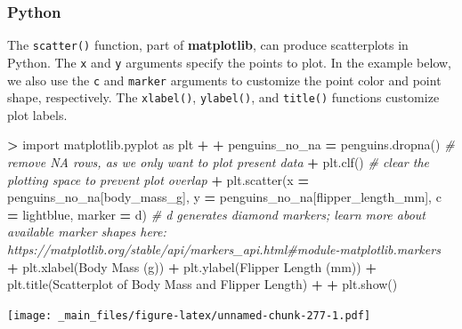 \documentclass[
]{book}
\newenvironment{Shaded}{\begin{snugshade}}{\end{snugshade}}
\newcommand{\CommentTok}[1]{\textcolor[rgb]{0.56,0.35,0.01}{\textit{#1}}}
\newcommand{\ImportTok}[1]{#1}
\newcommand{\NormalTok}[1]{#1}
\newcommand{\OperatorTok}[1]{\textcolor[rgb]{0.81,0.36,0.00}{\textbf{#1}}}
\newcommand{\StringTok}[1]{\textcolor[rgb]{0.31,0.60,0.02}{#1}}
\begin{document}
\hypertarget{python-43}{%
\subsubsection*{Python}\label{python-43}}

The \texttt{scatter()} function, part of \textbf{matplotlib}, can produce scatterplots in Python. The \texttt{x} and \texttt{y} arguments specify the points to plot. In the example below, we also use the \texttt{c} and \texttt{marker} arguments to customize the point color and point shape, respectively. The \texttt{xlabel()}, \texttt{ylabel()}, and \texttt{title()} functions customize plot labels.

\begin{Shaded}
\begin{Highlighting}[]
\OperatorTok{\textgreater{}} \ImportTok{import}\NormalTok{ matplotlib.pyplot }\ImportTok{as}\NormalTok{ plt}
\OperatorTok{+} 
\OperatorTok{+}\NormalTok{ penguins\_no\_na }\OperatorTok{=}\NormalTok{ penguins.dropna() }\CommentTok{\# remove NA rows, as we only want to plot present data}
\OperatorTok{+}\NormalTok{ plt.clf() }\CommentTok{\# clear the plotting space to prevent plot overlap}
\OperatorTok{+}\NormalTok{ plt.scatter(x }\OperatorTok{=}\NormalTok{ penguins\_no\_na[}\StringTok{\textquotesingle{}body\_mass\_g\textquotesingle{}}\NormalTok{], y }\OperatorTok{=}\NormalTok{ penguins\_no\_na[}\StringTok{\textquotesingle{}flipper\_length\_mm\textquotesingle{}}\NormalTok{], c }\OperatorTok{=} \StringTok{\textquotesingle{}lightblue\textquotesingle{}}\NormalTok{, marker }\OperatorTok{=} \StringTok{\textquotesingle{}d\textquotesingle{}}\NormalTok{) }\CommentTok{\# \textquotesingle{}d\textquotesingle{} generates diamond markers; learn more about available marker shapes here: https://matplotlib.org/stable/api/markers\_api.html\#module{-}matplotlib.markers}
\OperatorTok{+}\NormalTok{ plt.xlabel(}\StringTok{\textquotesingle{}Body Mass (g)\textquotesingle{}}\NormalTok{)}
\OperatorTok{+}\NormalTok{ plt.ylabel(}\StringTok{\textquotesingle{}Flipper Length (mm)\textquotesingle{}}\NormalTok{)}
\OperatorTok{+}\NormalTok{ plt.title(}\StringTok{\textquotesingle{}Scatterplot of Body Mass and Flipper Length\textquotesingle{}}\NormalTok{)}
\OperatorTok{+} 
\OperatorTok{+}\NormalTok{ plt.show()}
\end{Highlighting}
\end{Shaded}

\texttt{[image: \_main\_files/figure-latex/unnamed-chunk-277-1.pdf]}
\end{document}
